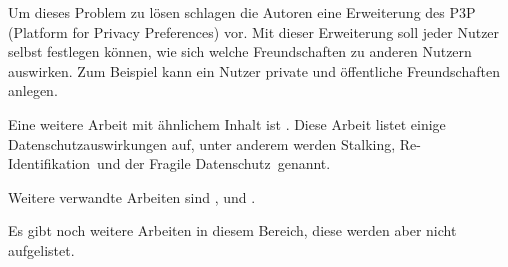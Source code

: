 Um dieses Problem zu lösen schlagen die Autoren eine Erweiterung des P3P (Platform for Privacy Preferences) vor. Mit dieser Erweiterung soll jeder Nutzer selbst festlegen können, wie sich welche Freundschaften zu anderen Nutzern auswirken. Zum Beispiel kann ein Nutzer private und öffentliche Freundschaften anlegen.


Eine weitere Arbeit mit ähnlichem Inhalt ist \citet{gross2005information}. Diese Arbeit listet einige Datenschutzauswirkungen auf, unter anderem werden \glqq Stalking\grqq , \glqq Re-Identifikation\grqq\ und der \glqq Fragile Datenschutz\grqq\ genannt.


Weitere verwandte Arbeiten sind \citet{hintz2014AGB}, \citet{mahmood2011privacy} und \citet{hintzPhishing}.

Es gibt noch weitere Arbeiten in diesem Bereich, diese werden aber nicht aufgelistet.